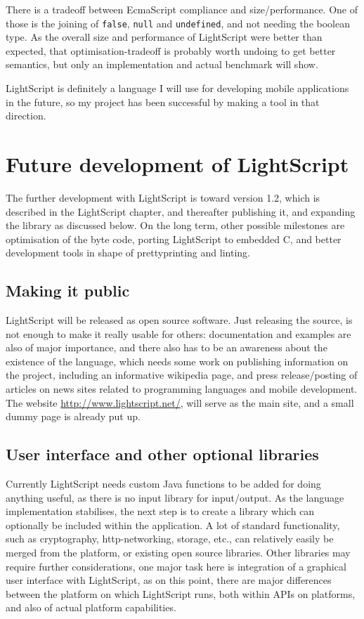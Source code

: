 \documentclass[11pt]{report}
\begin{document}
There is a tradeoff between EcmaScript compliance and size/performance. 
One of those is the joining of \verb|false|, \verb|null| and \verb|undefined|, and not needing the boolean type.
As the overall size and performance of LightScript were better than expected,
that optimisation-tradeoff is probably worth undoing to get better semantics, 
but only an implementation and actual benchmark will show. 

LightScript is definitely a language I will use for developing mobile applications in the future, so my project has been successful by making a tool in that direction.

\section{Future development of LightScript}
The further development with LightScript is toward version 1.2, which is described in the LightScript chapter, and thereafter publishing it, and expanding the library as discussed below.
On the long term, other possible milestones are optimisation of the byte code, porting LightScript to embedded C, and better development tools in shape of prettyprinting and linting.

\subsection{Making it public}
LightScript will be released as open source software. 
Just releasing the source, is not enough to make it really usable for others: documentation and examples are also of major importance, and there also has to be an awareness about the existence of the language, which needs some work on publishing information on the project, including an informative wikipedia page, and press release/posting of articles on news sites related to programming languages and mobile development.
The website \url{http://www.lightscript.net/}, will serve as the main site, and a small dummy page is already put up.

\subsection{User interface and other optional libraries}
Currently LightScript needs custom Java functions to be added for doing anything useful, as there is no input library for input/output.
As the language implementation stabilises, the next step is to create a library which can optionally be included within the application.
A lot of standard functionality, such as cryptography, http-networking, storage, etc.,  can relatively easily be merged from the platform, or existing open source libraries. 
Other libraries may require further considerations, one major task here is integration of a graphical user interface with LightScript, as on this point, there are major differences between the platform on which LightScript runs, both within APIs on platforms, and also of actual platform capabilities.
\end{document}
